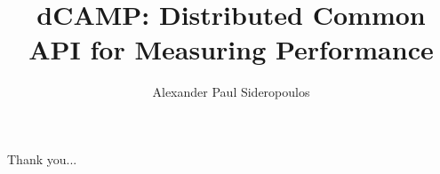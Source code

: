 \documentclass[12pt]{ucthesis}
\begin{document}

\title{dCAMP: Distributed Common API for Measuring Performance}
\author{Alexander Paul Sideropoulos}
  
 
     

\maketitle

\begin{frontmatter}

\copyrightpage

\committeemembershippage



\begin{acknowledgements}

   Thank you...

\end{acknowledgements}

\tableofcontents

\listoftables
\listoffigures

\end{frontmatter}

\pagestyle{plain}

\renewcommand{\baselinestretch}{1.66}











\clearpage




\appendix


\end{document}
